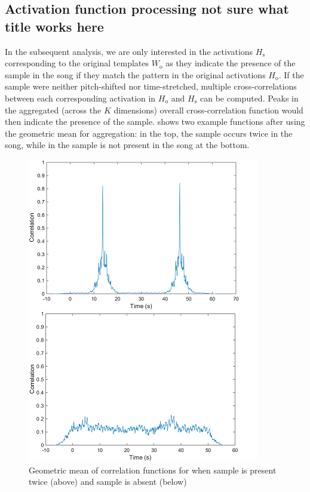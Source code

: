\documentclass{article}
\begin{document}
\subsection{Activation function processing {\color{red}not sure what title works here}
}
In the subsequent analysis, we are only interested in the activations $H_\mathrm{s}$ corresponding to the original templates $W_\mathrm{o}$ as they indicate the presence of the sample in the song if they match the pattern in the original activations $H_\mathrm{o}$. If the sample were neither pitch-shifted nor time-stretched, multiple cross-correlations between each corresponding activation in $H_\mathrm{o}$ and $H_\mathrm{s}$ can be computed. Peaks in the aggregated (across the $K$ dimensions) overall cross-correlation function would then indicate the presence of the sample.  shows two example functions after using the geometric mean for aggregation: in the top, the sample occurs twice in the song, while in the sample is not present in the song at the bottom.

\begin{figure}[t]
\centering
\includegraphics[width=\linewidth]{corr.png}
\caption{Geometric mean of correlation functions for when sample is present twice (above) and sample is absent (below)}
\label{fig1}
\end{figure}
\end{document}
